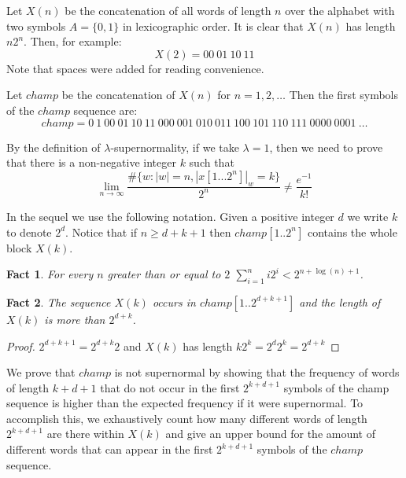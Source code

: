 \documentclass[11pt,a4paper]{tesis}
\newtheorem{fact}{Fact}[]
\begin{document}
Let $X(n)$ be the concatenation of all words of length $n$ over the alphabet with two symbols $A=\{0,1\}$ in lexicographic order.  It is clear that $X(n)$ has length $n2^n$. Then, for example:
$$X(2) = 00 \: 01 \: 10 \: 11$$
Note that spaces were added for reading convenience.

Let $champ$
 be the concatenation of $X(n)$ for $n = 1,2,\dots$
 Then the first symbols of the $champ$
sequence are:
$$champ = 0 \: 1 \: 00 \: 01 \: 10 \: 11 \: 000 \: 001 \: 010 \: 011 \: 100 \: 101 \: 110 \: 111 \: 0000 \: 0001 \: \dots$$

By the definition of $\lambda$-supernormality, if we take $\lambda = 1$, then we need to prove that there is a non-negative integer $k$ such that
$$\lim_{n\to\infty} \frac{\#\{w: |w| = n  , |x[1...2^n]|_w = k\}}{2^n} \neq \frac{e^{-1}}{k!}$$

\bigskip

In the sequel we use the following notation. Given  a positive integer $d$ we write $k$ to denote $2^d$.
Notice that if  $n \geq d + k + 1$ then $champ[1.. 2^n]$ contains the whole block $X(k)$.%


\begin{fact}
For every $n$ greater than or equal to $2$  $\sum_{i=1}^n i2^i < 2^{n + \log(n) + 1}$.
\end{fact}

\begin{fact} \label{p2}
The sequence $X(k)$ occurs in $champ[1.. 2^{d+k+1}]$ and  the length of $X(k)$ is more than $2^{d+k}$.
\end{fact}
\begin{proof}
  $2^{d+k+1} = 2^{d+k}2$ and $X(k)$ has length $k2^k = 2^d2^k = 2^{d+k}$ 
\end{proof}

We prove that $champ$ is not supernormal by showing that the frequency of words
 of length $k+d+1$ that do not occur in the first $2^{k+d+1}$ symbols of the champ
 sequence is higher than the expected frequency if it were supernormal.
To accomplish this, we exhaustively count how many different words of length $2^{k+d+1}$ 
are there within $X(k)$ and give an upper bound for the amount of different words that can 
appear in the first $2^{k+d+1}$ symbols of the $champ$ sequence.
\end{document}
